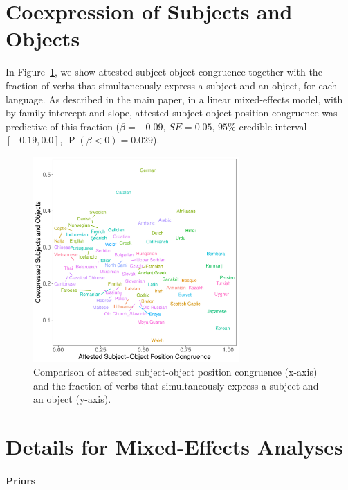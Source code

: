 \documentclass[11pt,a4paper]{article}
\newcommand\mhahn[1]{{\color{red}(#1)}}
\begin{document}



\section{Coexpression of Subjects and Objects}
In Figure~\ref{fig:study2}, we show attested subject-object congruence together with the fraction of verbs that simultaneously express a subject and an object, for each language.
As described in the main paper, in a linear mixed-effects model, with by-family intercept and slope, attested subject-object position congruence was predictive of this fraction ($\beta=-0.09$, $SE=0.05$, $95\%$ credible interval $[-0.19, 0.0]$, $\operatorname{P}(\beta<0) = 0.029$). %


\begin{figure}
    \centering
    \includegraphics[width=0.7\textwidth]{../analysis/figures/objects-order-pureud-byVerb_FORMAT.pdf}
    \caption{Comparison of attested subject-object position congruence (x-axis) and the fraction of verbs that simultaneously express a subject and an object (y-axis).}
    \label{fig:study2}
\end{figure}


\section{Details for Mixed-Effects Analyses}

\paragraph{Priors}
\end{document}
